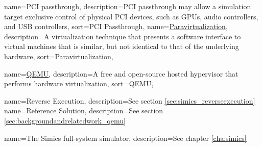 \newcommand{\dvttermpci}{\dvtcmdabbrev{dvtglosspci}}
{
  name={PCI passthrough},
  description={PCI passthrough may allow a simulation target exclusive control of physical PCI devices, such as GPUs, audio controllers, and USB controllers},
  sort={PCI Passthrough},
}
\newcommand{\dvttermpcipassthrough}{\dvttermpci\ \dvtcmdcaponcegloss{dvtglosspcipassthrough}{Passthrough}}
{
  name=\href{http://en.wikipedia.org/wiki/Paravirtualization}{Paravirtualization},
  description={A virtualization technique that presents a software interface to virtual machines that is similar, but not identical to that of the underlying hardware},
  sort={Paravirtualization},
}
\newcommand{\dvttermparavirtualization}{\dvtcmdcaponcegloss{dvtglossparavirtualization}{Paravirtualization}}
\newcommand{\dvttermpython}{\texttt{Python}}

{
  name=\href{http://en.wikipedia.org/wiki/QEMU}{QEMU},
  description={A free and open-source hosted hypervisor that performs hardware virtualization},
  sort={QEMU},
}
\newcommand{\dvttermqemu}{\glslink{dvtglossqemu}{QEMU}} %

{
  name=Reverse Execution,
  description={See section \ref{sec:simics_reverseexecution}}
}
\newcommand{\dvttermreverseexecution}{\dvtcmdcaponcegloss{dvtglossreverseexecution}{Reverse Execution}}
{
  name=Reference Solution,
  description={See section \ref{sec:backgroundandrelatedwork_qemu}}
}
\newcommand{\dvttermreferencesolution}{\dvtcmdcaponcegloss{dvtglossreferencesolution}{Reference Solution}}

\newcommand{\dvttermsoftwarerendering}{\dvtcmdcaponce{Software Rendering}}
{
  name=The Simics full-system simulator,
  description={See chapter \ref{cha:simics}}
}
\newcommand{\dvttermsimics}{\glslink{dvtglosssimics}{Simics}}
\newcommand{\dvttermsics}{\dvtcmdabbrev{dvtglosssics}}
\newcommand{\dvttermsunmicrosystems}{Sun Microsystems, Inc.}
\newcommand{\dvttermsimd}{\dvtcmdabbrev{dvtglosssimd}}

